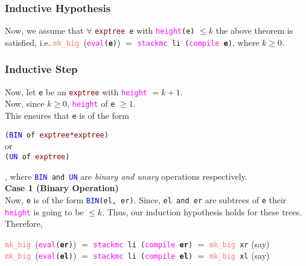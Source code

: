 \documentclass{article}
\begin{document}
\subsubsection*{Inductive Hypothesis}
Now, we assume that \( \forall \) \texttt{\textcolor{Maroon}{exptree} e} with \texttt{\textcolor{Fuchsia}{height}(e)} \(\leq k\) the above theorem is satisfied, i.e. \texttt{\textcolor{Salmon}{mk\_big} }(\texttt{\textcolor{Fuchsia}{eval}(\textbf{e})}) \(=\) \texttt{\textcolor{Fuchsia}{stackmc} li (\textcolor{Fuchsia}{compile} \textbf{e})}, where \( k \geq 0\). \\[10 pt]
\subsubsection*{Inductive Step}
Now, let \texttt{e} be an \texttt{\textcolor{Maroon}{exptree}} with \texttt{\textcolor{Fuchsia}{height}} \(= k+1 \).\\[5pt]Now, since  \( k \geq 0\), \texttt{\textcolor{Fuchsia}{height}} of \texttt{e} \( \geq 1\).\\[5pt] This ensures that \texttt{e} is of the form
\begin{center}
    \texttt{(\textcolor{blue}{BIN} of \textcolor{Maroon}{exptree}*\textcolor{Maroon}{exptree})}\\ or \\\texttt{(\textcolor{blue}{UN} of \textcolor{Maroon}{exptree})}
\end{center}
, where \texttt{\textcolor{blue}{BIN} and \textcolor{blue}{UN}} are \textit{binary and unary} operations respectively. \\[10 pt]
\textbf{Case 1 (Binary Operation)} \\ [5 pt]
    Now, \texttt{e} is of the form \texttt{\textcolor{blue}{BIN}(el, er)}. Since, \texttt{el and er} are subtrees of \texttt{e} their \texttt{\textcolor{Fuchsia}{height}} is going to be \( \leq k\). Thus, our induction hypothesis holds for these trees. Therefore,
    \begin{center}
        \texttt{\textcolor{Salmon}{mk\_big} }(\texttt{\textcolor{Fuchsia}{eval}(\textbf{er})}) \(=\) \texttt{\textcolor{Fuchsia}{stackmc} li (\textcolor{Fuchsia}{compile} \textbf{er})} \(=\) \texttt{\textcolor{Salmon}{mk\_big} xr} (say) \\[5pt]
        \texttt{\textcolor{Salmon}{mk\_big} }(\texttt{\textcolor{Fuchsia}{eval}(\textbf{el})}) \(=\) \texttt{\textcolor{Fuchsia}{stackmc} li (\textcolor{Fuchsia}{compile} \textbf{el})} \(=\) \texttt{\textcolor{Salmon}{mk\_big} xl} (say)
    \end{center}
\end{document}

